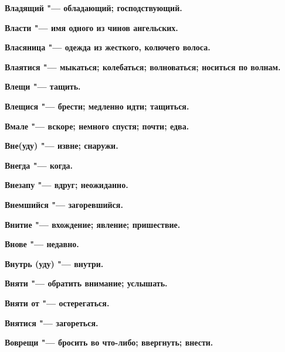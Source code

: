 \bfseries Владящий \normalfont{} "--- обладающий; господствующий. 




\bfseries Власти \normalfont{} "--- имя одного из чинов ангельских. 




\bfseries Власяница \normalfont{} "--- одежда из жесткого, колючего волоса. 




\bfseries Влаятися \normalfont{} "--- мыкаться; колебаться; волноваться; носиться по волнам. 




\bfseries Влещи \normalfont{} "--- тащить. 




\bfseries Влещися \normalfont{} "--- брести; медленно идти; тащиться. 




\bfseries Вмале \normalfont{} "--- вскоре; немного спустя; почти; едва. 




\bfseries Вне(уду) \normalfont{} "--- извне; снаружи. 




\bfseries Внегда \normalfont{} "--- когда. 




\bfseries Внезапу \normalfont{} "--- вдруг; неожиданно. 




\bfseries Внемшийся \normalfont{} "--- загоревшийся. 




\bfseries Внитие \normalfont{} "--- вхождение; явление; пришествие. 




\bfseries Внове \normalfont{} "--- недавно. 




\bfseries Внутрь (уду) \normalfont{} "--- внутри. 




\bfseries Вняти \normalfont{} "--- обратить внимание; услышать. 




\bfseries Вняти от \normalfont{} "--- остерегаться. 




\bfseries Внятися \normalfont{} "--- загореться. 




\bfseries Воврещи \normalfont{} "--- бросить во что-либо; ввергнуть; внести. 




